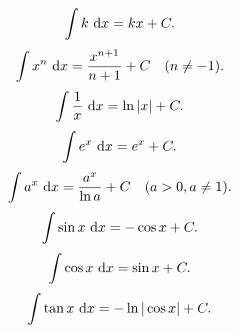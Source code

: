 \[
	\int k \, \mathop{}\!\mathrm{d} x           = kx + C
	.\]
\[
	\int x^n \, \mathop{}\!\mathrm{d} x         = \frac{x^{n+1}}{n+1} + C \quad (n \neq -1)
	.\]
\[
	\int \frac{1}{x} \, \mathop{}\!\mathrm{d} x = \ln|x| + C
	.\]
\[
	\int e^x \, \mathop{}\!\mathrm{d} x         = e^x + C
	.\]
\[
	\int a^x \, \mathop{}\!\mathrm{d} x         = \frac{a^x}{\ln a} + C \quad (a > 0, a \neq 1)
	.\]
\[
	\int \sin x \, \mathop{}\!\mathrm{d} x      = -\cos x + C
	.\]
\[
	\int \cos x \, \mathop{}\!\mathrm{d} x      = \sin x + C
	.\]
\[
	\int \tan x \, \mathop{}\!\mathrm{d} x      = -\ln|\cos x| + C
	.\]
